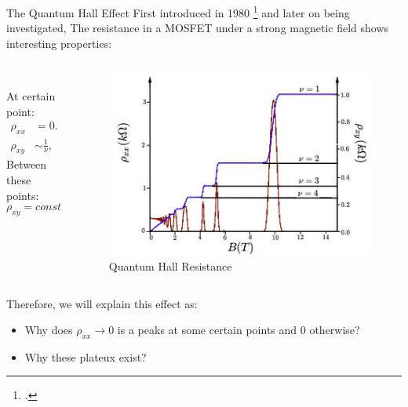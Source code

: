 \documentclass{beamer}
\begin{document}
\begin{frame}{The Quantum Hall Effect}
\quad First introduced in 1980 \footcite{Kitzling_1980} and later on being investigated, The resistance in a MOSFET under a strong magnetic field shows interesting properties:\null\\
\begin{columns}
\begin{column}{0.5\textwidth}
\\
\quad At certain point:
\begin{align*}
	\rho_{xx} &= 0.\\
	\rho_{xy} &\sim \frac{1}{\nu}, \quad \nu \in \mathbb{N}
\end{align*}
\quad Between these points:
$$\rho_{xy} = const.$$
\end{column}
\begin{column}{0.5\textwidth}
\begin{figure}
	\includegraphics[width=0.8\linewidth]{Images/Rhoxy.jpg}
\caption{Quantum Hall Resistance
	\cite*[Taken from ][]{manchesterAdvancedQuantum}}
\label{Fig: QHE}
\end{figure}
\end{column}
\end{columns}
\begin{center}
\end{center}
\end{frame}
\begin{frame}
\quad Therefore, we will explain this effect as:
\begin{itemize}
	\item Why does \(\rho_{xx} \to 0\) is a peaks at some certain points and \(0\) otherwise?
	\item Why these plateux exist?
\end{itemize}
\end{frame}
\end{document}
